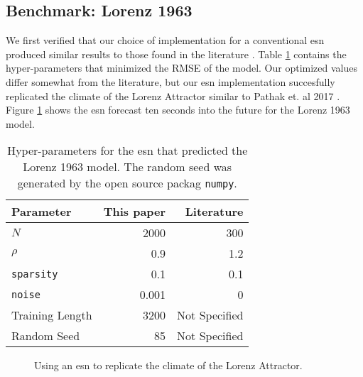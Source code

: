\subsection{Benchmark: Lorenz 1963}

We first verified that our choice of implementation for a conventional \gls{esn}
produced similar results to those found in the literature
\cite{pathak_using_2017}. Table \ref{tab:lorenzparam} contains the hyper-parameters
that minimized the RMSE of the model. Our optimized values differ
somewhat from the literature, but our \gls{esn} implementation
succesfully replicated the climate of the Lorenz Attractor similar to Pathak
et. al 2017 \cite{pathak_using_2017}. Figure \ref{fig:lorenz63} shows the
\gls{esn} forecast ten seconds into the future for the Lorenz 1963 model.


\begin{table}[H]
  \centering
  \caption{Hyper-parameters for the \gls{esn} that predicted the Lorenz 1963
  model. The random seed was generated by the open source packag
  \texttt{numpy}.}
  \label{tab:lorenzparam}
  \begin{tabular}{l r r}
    \hline
    Parameter & This paper & Literature \cite{pathak_using_2017}\\
    \hline
    $N$ & 2000& 300\\
    $\rho$& 0.9&1.2\\
    \texttt{sparsity}& 0.1& 0.1\\
    \texttt{noise}& 0.001& 0\\
    Training Length & 3200& Not Specified\\
    Random Seed & 85 & Not Specified\\
    \hline
  \end{tabular}
\end{table}
\begin{figure}[H]
  \centering
  \resizebox{\columnwidth}{!}{}
  \caption{Using an \gls{esn} to replicate the climate of the Lorenz Attractor.}
  \label{fig:lorenz63}
\end{figure}
